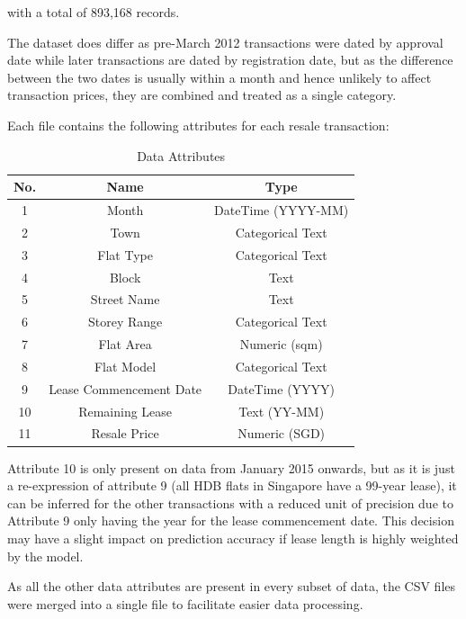 \documentclass[[12pt,conference]{IEEEtran}
\begin{document}
with a total of 893,168 records. 

The dataset does differ as pre-March 2012 transactions were dated by approval date while later transactions are dated by registration date, but as the difference between the two dates is usually within a month and hence unlikely to affect transaction prices, they are combined and treated as a single category. 

Each file contains the following attributes for each resale transaction:
\begin{table}[H]
\vspace{-1em}
\caption{Data Attributes}
\label{tab:data-attributes}
\centering
\begin{tabular}{c|c|c}
No. & Name                    & Type               \\ \hline
1   & Month                   & DateTime (YYYY-MM) \\
2   & Town                    & Categorical Text   \\
3   & Flat Type               & Categorical Text   \\
4   & Block                   & Text   \\
5   & Street Name             & Text   \\
6   & Storey Range            & Categorical Text   \\
7   & Flat Area               & Numeric (sqm)      \\
8   & Flat Model              & Categorical Text   \\
9   & Lease Commencement Date & DateTime (YYYY)    \\
10  & Remaining Lease         & Text (YY-MM)               \\
11  & Resale Price            & Numeric (SGD)     
\end{tabular}
\end{table}

Attribute 10 is only present on data from January 2015 onwards, but as it is just a re-expression of attribute 9 (all HDB flats in Singapore have a 99-year lease), it can be inferred for the other transactions with a reduced unit of precision due to Attribute 9 only having the year for the lease commencement date. This decision may have a slight impact on prediction accuracy if lease length is highly weighted by the model. 

As all the other data attributes are present in every subset of data, the CSV files were merged into a single file to facilitate easier data processing. 
\end{document}
